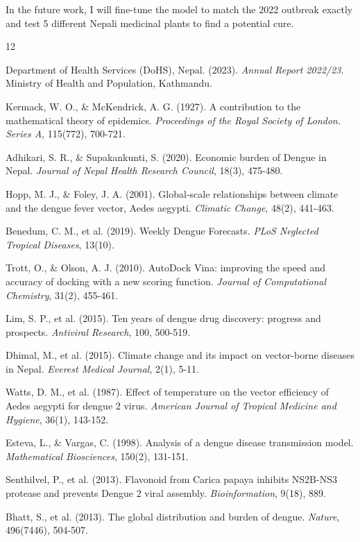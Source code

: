 \documentclass[12pt, a4paper]{article}
\begin{document}
In the future work, I will fine-tune the model to match the 2022 outbreak exactly and test 5 different Nepali medicinal plants to find a potential cure.

\newpage

\begin{thebibliography}{12}

Department of Health Services (DoHS), Nepal. (2023). \textit{Annual Report 2022/23}. Ministry of Health and Population, Kathmandu.

Kermack, W. O., \& McKendrick, A. G. (1927). A contribution to the mathematical theory of epidemics. \textit{Proceedings of the Royal Society of London. Series A}, 115(772), 700-721.

Adhikari, S. R., \& Supakankunti, S. (2020). Economic burden of Dengue in Nepal. \textit{Journal of Nepal Health Research Council}, 18(3), 475-480.

Hopp, M. J., \& Foley, J. A. (2001). Global-scale relationships between climate and the dengue fever vector, Aedes aegypti. \textit{Climatic Change}, 48(2), 441-463.

Benedum, C. M., et al. (2019). Weekly Dengue Forecasts. \textit{PLoS Neglected Tropical Diseases}, 13(10).

Trott, O., \& Olson, A. J. (2010). AutoDock Vina: improving the speed and accuracy of docking with a new scoring function. \textit{Journal of Computational Chemistry}, 31(2), 455-461.

Lim, S. P., et al. (2015). Ten years of dengue drug discovery: progress and prospects. \textit{Antiviral Research}, 100, 500-519.

Dhimal, M., et al. (2015). Climate change and its impact on vector-borne diseases in Nepal. \textit{Everest Medical Journal}, 2(1), 5-11.

Watts, D. M., et al. (1987). Effect of temperature on the vector efficiency of Aedes aegypti for dengue 2 virus. \textit{American Journal of Tropical Medicine and Hygiene}, 36(1), 143-152.

Esteva, L., \& Vargas, C. (1998). Analysis of a dengue disease transmission model. \textit{Mathematical Biosciences}, 150(2), 131-151.

Senthilvel, P., et al. (2013). Flavonoid from Carica papaya inhibits NS2B-NS3 protease and prevents Dengue 2 viral assembly. \textit{Bioinformation}, 9(18), 889.

Bhatt, S., et al. (2013). The global distribution and burden of dengue. \textit{Nature}, 496(7446), 504-507.

\end{thebibliography}
\end{document}
